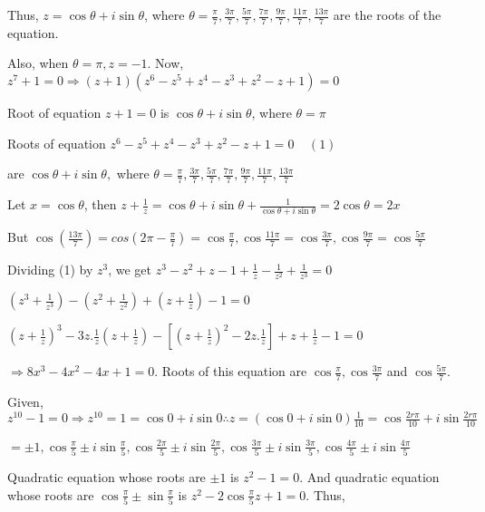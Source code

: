   Thus, $z = \cos\theta + i \sin\theta$, where $\theta = \frac{\pi}{7}, \frac{3\pi}{7}, \frac{5\pi}{7},
  \frac{7\pi}{7}, \frac{9\pi}{7}, \frac{11\pi}{7}, \frac{13\pi}{7}$ are the roots of the equation.

  Also, when $\theta = \pi, z = -1$. Now, $z^7 + 1 = 0 \Rightarrow (z + 1)(z^6 - z^5 + z^4 - z^3 + z^2 - z +
  1) = 0$

  Root of equation $z + 1 = 0$ is $\cos \theta + i \sin \theta$, where $\theta = \pi$

  Roots of equation $z^6 - z^5 + z^4 - z^3 + z^2 - z + 1 = 0\;\;\;\;(1)$

  are $\cos \theta + i \sin \theta,$ where $\theta = \frac{\pi}{7}, \frac{3\pi}{7}, \frac{5\pi}{7},
  \frac{7\pi}{7}, \frac{9\pi}{7}, \frac{11\pi}{7}, \frac{13\pi}{7}$

  Let $x = \cos \theta$, then $z + \frac{1}{z} = \cos \theta + i \sin \theta + \frac{1}{\cos \theta +
    i \sin \theta} = 2\cos\theta = 2x$

  But $\cos\left(\frac{13\pi}{7}\right) = cos\left(2\pi - \frac{\pi}{7}\right) = \cos\frac{\pi}{7},
  \cos\frac{11\pi}{7} = \cos\frac{3\pi}{7}, \cos\frac{9\pi}{7} = \cos\frac{5\pi}{7}$

  Dividing (1) by $z^3$, we get $z^3 - z^2 + z - 1 + \frac{1}{z} - \frac{1}{z^2} + \frac{1}{z^3} = 0$

  $\left(z^3 + \frac{1}{z^3}\right) - \left(z^2 + \frac{1}{z^2}\right) + \left(z + \frac{1}{z}\right) - 1 =
  0$

  $\left(z + \frac{1}{z}\right)^3 - 3z.\frac{1}{z}\left(z + \frac{1}{z}\right) - \left[\left(z +
    \frac{1}{z}\right)^2 - 2z.\frac{1}{z}\right] + z + \frac{1}{z} - 1 = 0$

  $\Rightarrow 8x^3 - 4x^2 -4x + 1 = 0$. Roots of this equation are $\cos \frac{\pi}{7}, \cos
  \frac{3\pi}{7}$ and $\cos \frac{5\pi}{7}$.
\item Given, $z^{10} - 1 = 0 \Rightarrow z^{10} = 1 = \cos 0 + i \sin 0\therefore z = (\cos 0 + i \sin
  0)\frac{1}{10} = \cos\frac{2r\pi}{10} + i \sin\frac{2r\pi}{10}$

  $= \pm 1, \cos\frac{\pi}{5} \pm i\sin\frac{\pi}{5}, \cos\frac{2\pi}{5} \pm i\sin\frac{2\pi}{5},
  \cos\frac{3\pi}{5} \pm i\sin\frac{3\pi}{5}, \cos\frac{4\pi}{5} \pm i\sin\frac{4\pi}{5}$

  Quadratic equation whose roots are $\pm 1$ is $z^2 - 1 = 0$. And quadratic equation whose roots are
  $\cos\frac{\pi}{5} \pm \sin\frac{\pi}{5}$ is $z^2 - 2\cos\frac{\pi}{5}z + 1 = 0$. Thus,

